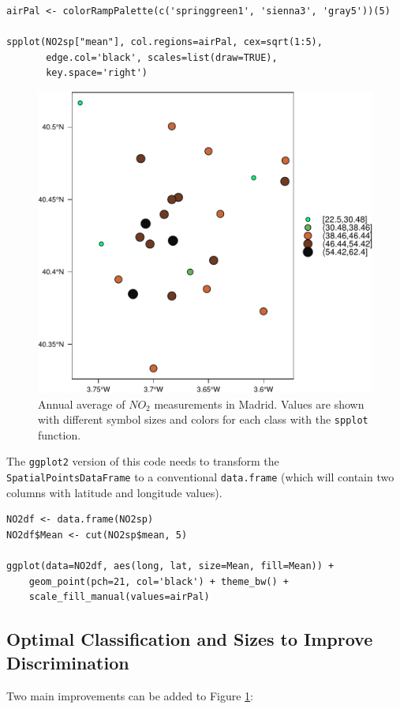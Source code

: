 \lstset{language=R,numbers=none}
\begin{lstlisting}
airPal <- colorRampPalette(c('springgreen1', 'sienna3', 'gray5'))(5)

spplot(NO2sp["mean"], col.regions=airPal, cex=sqrt(1:5),
       edge.col='black', scales=list(draw=TRUE),
       key.space='right')
\end{lstlisting}

\begin{figure}[htb]
\centering
\includegraphics[width=.9\linewidth]{figs/airMadrid_spplot.pdf}
\caption{\label{fig:airMadrid_spplot}Annual average of $NO_2$ measurements in Madrid. Values are shown with different symbol sizes and  colors for each class with the \texttt{spplot} function.}
\end{figure}

The \texttt{ggplot2} version of this code needs to transform the
\texttt{SpatialPointsDataFrame} to a conventional \texttt{data.frame} (which
will contain two columns with latitude and longitude values).
\lstset{language=R,numbers=none}
\begin{lstlisting}
NO2df <- data.frame(NO2sp)
NO2df$Mean <- cut(NO2sp$mean, 5)

ggplot(data=NO2df, aes(long, lat, size=Mean, fill=Mean)) +
    geom_point(pch=21, col='black') + theme_bw() +
    scale_fill_manual(values=airPal)
\end{lstlisting}
\subsection{Optimal Classification and Sizes to Improve Discrimination}
\label{sec-1-3}
Two main improvements can be added to Figure
\ref{fig:airMadrid_spplot}:

